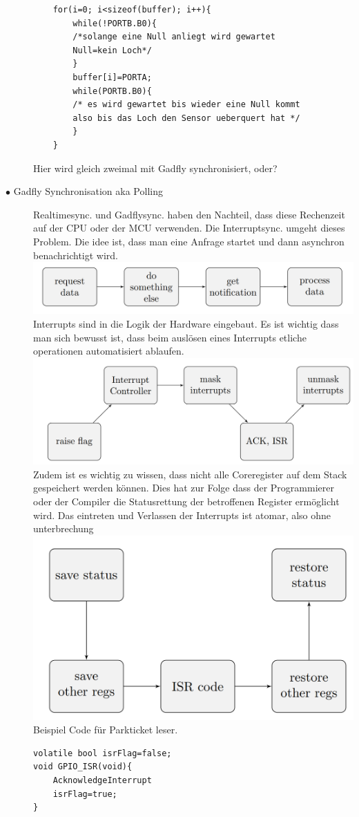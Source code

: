 \documentclass[a4paper, 8pt]{extarticle}
\begin{document}
\begin{multicols*}{3}
\begin{description}
\begin{lstlisting}
	for(i=0; i<sizeof(buffer); i++){
		while(!PORTB.B0){
		/*solange eine Null anliegt wird gewartet
		Null=kein Loch*/						
		}
		buffer[i]=PORTA;
		while(PORTB.B0){
		/* es wird gewartet bis wieder eine Null kommt 
		also bis das Loch den Sensor ueberquert hat */						
		}
	}
							\end{lstlisting}  
							Hier wird gleich zweimal mit Gadfly synchronisiert, oder?
						\item[$\bullet$ Gadfly Synchronisation aka Polling]
							Realtimesync. und Gadflysync. haben den Nachteil, dass diese Rechenzeit auf der CPU oder der MCU verwenden.
							Die Interruptsync. umgeht dieses Problem. Die idee ist, dass man eine Anfrage startet und dann asynchron benachrichtigt 
							wird.
							\includegraphics[width=0.6\linewidth,left]{img/interruptsync_1.PNG}
							Interrupts sind in die Logik der Hardware eingebaut. Es ist wichtig dass man sich bewusst ist, dass beim auslösen 
							eines Interrupts etliche operationen automatisiert ablaufen.
							\includegraphics[width=0.6\linewidth,left]{img/interruptsync_2.PNG}
							Zudem ist es wichtig zu wissen, dass nicht alle Coreregister auf dem Stack gespeichert werden können. Dies hat zur Folge dass
							der Programmierer oder der Compiler die Statusrettung der  betroffenen Register ermöglicht wird.  Das eintreten und Verlassen der Interrupts 
							ist atomar, also ohne unterbrechung
							\includegraphics[width=0.6\linewidth,left]{img/interruptsync_3.PNG}
							Beispiel Code für Parkticket leser. 
							\begin{lstlisting}
volatile bool isrFlag=false;
void GPIO_ISR(void){
	AcknowledgeInterrupt
	isrFlag=true;
}


\end{lstlisting}
\end{description}
\end{multicols*}
\end{document}
